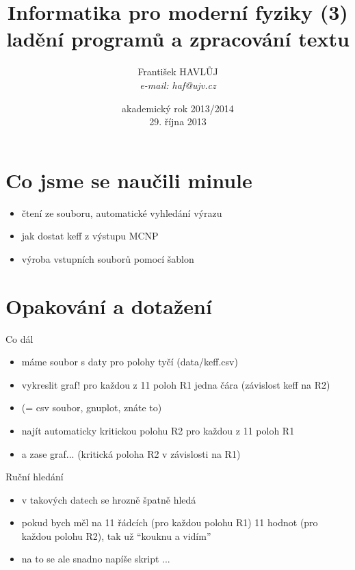 \documentclass{beamer}
\title[IMF (3)]{Informatika pro moderní fyziky (3)\\ladění programů a zpracování textu}
\author[Franti\v{s}ek HAVL\r{U}J, ORF ÚJV Řež]{Franti\v{s}ek HAVL\r{U}J\\{\scriptsize \emph{e-mail: haf@ujv.cz}}}
\date{akademický rok 2013/2014\\29. října 2013}
\institute[ORF ÚJV Řež]
{ÚJV Řež\\oddělení Reaktorové fyziky a podpory palivového cyklu}
\begin{document}
\begin{frame}
  \titlepage
\end{frame}

\begin{frame}
  \tableofcontents
\end{frame}

\section{Co jsme se naučili minule}

\begin{frame}{}
  \begin{itemize}
    \item čtení ze souboru, automatické vyhledání výrazu
    \item jak dostat keff z výstupu MCNP
    \item výroba vstupních souborů pomocí šablon
  \end{itemize}
\end{frame}

\section{Opakování a dotažení}

\begin{frame}{Co dál}
  \begin{itemize}
    \item máme soubor s daty pro polohy tyčí (data/keff.csv)
    \item vykreslit graf! pro každou z 11 poloh R1 jedna čára (závislost keff na R2)
    \item (= csv soubor, gnuplot, znáte to)
    \item najít automaticky kritickou polohu R2 pro každou z 11 poloh R1
    \item a zase graf... (kritická poloha R2 v závislosti na R1)
  \end{itemize}
\end{frame}

\begin{frame}{Ruční hledání}
  \begin{itemize}
    \item v takových datech se hrozně špatně hledá
    \item pokud bych měl na 11 řádcích (pro každou polohu R1) 11 hodnot (pro každou polohu R2), tak už ``kouknu a vidím''
    \item na to se ale snadno napíše skript ...
  \end{itemize}
\end{frame}
\end{document}
